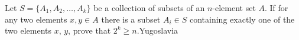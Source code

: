 Let $S = \{A_1,A_2,\ldots ,A_k\}$ be a collection of subsets of an $n$-element set $A$. If for any two elements $x, y \in A$ there is a subset $A_i \in S$ containing exactly one of the two elements $x$,  $y$,  prove that $2^k\geq n$.Yugoslavia